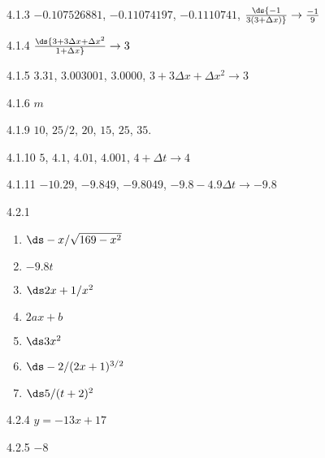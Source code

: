 \begin{Answer}{4.1.3}
$-0.107526881$, $-0.11074197$, $-0.1110741$,
$\ds{-1\over3(3+\Delta x)}\rightarrow {-1\over9}$
\end{Answer}
\begin{Answer}{4.1.4}
$\ds{3+3\Delta x+\Delta x^2\over1+\Delta x}\rightarrow3$
\end{Answer}
\begin{Answer}{4.1.5}
$3.31$, $3.003001$, $3.0000$,\hfill\break
 $3+3\Delta x+\Delta x^2\rightarrow3$
\end{Answer}
\begin{Answer}{4.1.6}
$m$
\end{Answer}
\begin{Answer}{4.1.9}
$10$, $25/2$, $20$, $15$, $25$, $35$.
\end{Answer}
\begin{Answer}{4.1.10}
$5$, $4.1$, $4.01$, $4.001$, $4+\Delta t\rightarrow 4$
\end{Answer}
\begin{Answer}{4.1.11}
$-10.29$, $-9.849$, $-9.8049$, \hfill\break
$-9.8-4.9\Delta t\rightarrow -9.8$
\end{Answer}
\begin{Answer}{4.2.1}
\begin{enumerate}
	\item	$\ds -x/\sqrt{169-x^2}$
	\item	$-9.8t$
	\item	$\ds 2x+1/x^2$
	\item	$2ax+b$
	\item	$\ds 3x^2$
	\item	$\ds -2/(2x+1)^{3/2}$
	\item	$\ds 5/(t+2)^2$
\end{enumerate}
\end{Answer}
\begin{Answer}{4.2.4}
	$y=-13x+17$
\end{Answer}
\begin{Answer}{4.2.5}
	$-8$
\end{Answer}
